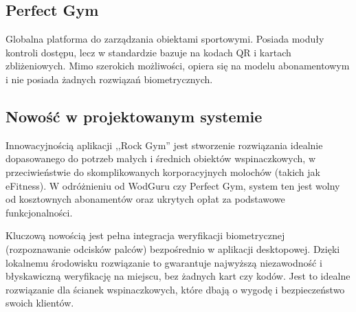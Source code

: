 \subsection{Perfect Gym}\cite{PerfectGym}
Globalna platforma do zarządzania obiektami sportowymi. Posiada moduły kontroli dostępu, lecz w standardzie bazuje na kodach QR i kartach zbliżeniowych. Mimo szerokich możliwości, opiera się na modelu abonamentowym i nie posiada żadnych rozwiązań biometrycznych.

\subsection{Nowość w projektowanym systemie}
Innowacyjnością aplikacji ,,Rock Gym'' jest stworzenie rozwiązania idealnie dopasowanego do potrzeb małych i średnich obiektów wspinaczkowych, w przeciwieństwie do skomplikowanych korporacyjnych molochów (takich jak eFitness). W odróżnieniu od WodGuru czy Perfect Gym, system ten jest wolny od kosztownych abonamentów oraz ukrytych opłat za podstawowe funkcjonalności.

Kluczową nowością jest pełna integracja weryfikacji biometrycznej (rozpoznawanie odcisków palców) bezpośrednio w aplikacji desktopowej. Dzięki lokalnemu środowisku rozwiązanie to gwarantuje najwyższą niezawodność i błyskawiczną weryfikację na miejscu, bez żadnych kart czy kodów. Jest to idealne rozwiązanie dla ścianek wspinaczkowych, które dbają o wygodę i bezpieczeństwo swoich klientów.